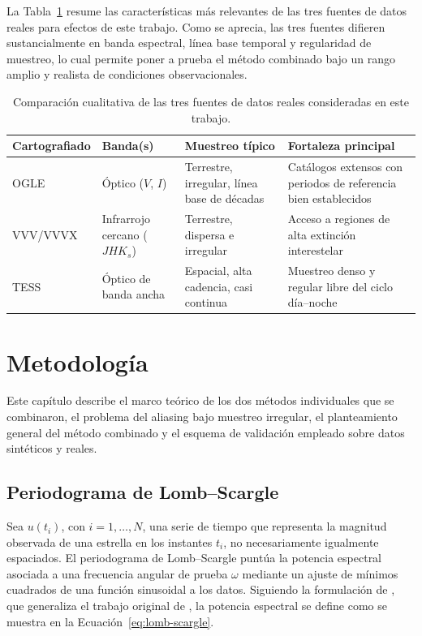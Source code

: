 \documentclass[12pt,letterpaper,oneside]{book}
\begin{document}
La Tabla~\ref{tab:comparacion-datos} resume las caracter\'isticas m\'as relevantes de las tres fuentes de datos reales para efectos de este trabajo. Como se aprecia, las tres fuentes difieren sustancialmente en banda espectral, l\'inea base temporal y regularidad de muestreo, lo cual permite poner a prueba el m\'etodo combinado bajo un rango amplio y realista de condiciones observacionales.

\begin{table}[H]
	\centering
	\begin{tabular}{p{2.6cm}p{2.8cm}p{3.4cm}p{4.4cm}}
		\hline
		\textbf{Cartografiado} & \textbf{Banda(s)} & \textbf{Muestreo t\'ipico} & \textbf{Fortaleza principal} \\
		\hline
		OGLE & \'Optico ($V$, $I$) & Terrestre, irregular, l\'inea base de d\'ecadas & Cat\'alogos extensos con periodos de referencia bien establecidos \\
		VVV/VVVX & Infrarrojo cercano ($JHK_s$) & Terrestre, dispersa e irregular & Acceso a regiones de alta extinci\'on interestelar \\
		TESS & \'Optico de banda ancha & Espacial, alta cadencia, casi continua & Muestreo denso y regular libre del ciclo d\'ia--noche \\
		\hline
	\end{tabular}
	\caption[Comparaci\'on de las fuentes de datos reales]{Comparaci\'on cualitativa de las tres fuentes de datos reales consideradas en este trabajo.}
	\label{tab:comparacion-datos}
\end{table}


\chapter{Metodolog\'ia}
\label{ch:metodologia}

Este cap\'itulo describe el marco te\'orico de los dos m\'etodos individuales que se combinaron, el problema del aliasing bajo muestreo irregular, el planteamiento general del m\'etodo combinado y el esquema de validaci\'on empleado sobre datos sint\'eticos y reales.

\section{Periodograma de Lomb--Scargle}
\label{sec:metodologia-ls}

Sea $u(t_i)$, con $i = 1, \dots, N$, una serie de tiempo que representa la magnitud observada de una estrella en los instantes $t_i$, no necesariamente igualmente espaciados. El periodograma de Lomb--Scargle punt\'ua la potencia espectral asociada a una frecuencia angular de prueba $\omega$ mediante un ajuste de m\'inimos cuadrados de una funci\'on sinusoidal a los datos. Siguiendo la formulaci\'on de \citet{scargle_1982}, que generaliza el trabajo original de \citet{lomb_1976}, la potencia espectral se define como se muestra en la Ecuaci\'on~\eqref{eq:lomb-scargle}.
\end{document}
